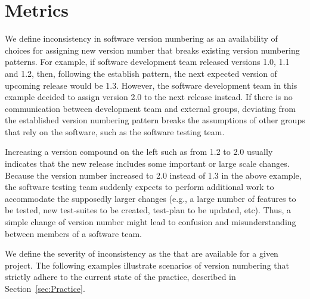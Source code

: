 \documentclass[conference]{IEEEtran}
\begin{document}
\section{Metrics}

We define inconsistency in software version numbering as an availability of choices for assigning new version number that breaks existing version numbering patterns. 
For example, if software development team released versions 1.0, 1.1 and 1.2, then, following the establish pattern, the next expected version of upcoming release would be 1.3. 
However,  the software development team in this example decided to assign version 2.0 to the next release instead.
If there is no communication between development team and external groups, deviating from the established version numbering pattern breaks the assumptions of other groups that rely on the software, such as the software testing team.

Increasing a version compound on the left such as from 1.2 to 2.0 usually indicates that the new release includes some important or large scale changes. Because the version number increased to 2.0 instead of 1.3 in the above example,  the software testing team suddenly expects to perform additional work to accommodate the supposedly larger changes (e.g., a large number of features to be tested, new test-suites to be created, test-plan to be updated, etc).
Thus, a simple change of version number might lead to confusion and misunderstanding between members of a software team.


We define the severity of inconsistency as the \numberchoices that are available for a 
given project. The following examples illustrate scenarios of version numbering that strictly adhere to the current state of the practice, described in 
Section~\ref{sec:Practice}.\\
\end{document}
